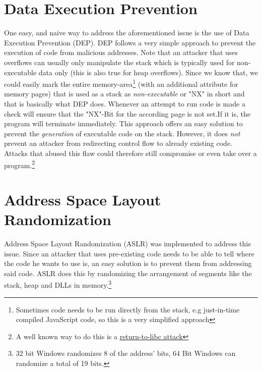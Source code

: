 \documentclass[10pt,twocolumn,a4paper]{article}
\begin{document}
\section{Data Execution Prevention}\label{sec:DEP}
One easy, and naive way to address the aforementioned issue is the use of Data Execution Prevention (DEP).
DEP follows a very simple approach to prevent the execution of code from malicious addresses.
Note that an attacker that uses overflows can usually only manipulate the stack which is typically used for non-executable data only (this is also true for heap overflows).
Since we know that, we could easily mark the entire memory-area\footnote{Sometimes code needs to be run directly from the stack, e.g just-in-time compiled JavaScript code, so this is a very simplified approach} (with an additional attribute for memory pages) that is used as a stack as \emph{non-executable} or "NX" in short and that is basically what DEP does.
Whenever an attempt to run code is made a check will ensure that the "NX"-Bit for the according page is not set.If it is, the program will terminate immediately.
This approach offers an easy solution to prevent the \emph{generation} of executable code on the stack. However, it does \emph{not} prevent an attacker from redirecting control flow to already existing code. Attacks that abused this flaw could therefore still compromise or even take over a program.\footnote{A well known way to do this is a \hyperref{https://en.wikipedia.org/wiki/Return-to-libc_attack}{Return-to-Libc Exploits}{name}{return-to-libc attack}}

\section{Address Space Layout Randomization}\label{sec:ASLR}
Address Space Layout Randomization (ASLR) was implemented to address this issue.
Since an attacker that uses pre-existing code needs to be able to tell where the code he wants to use is, an easy solution is to prevent them from addressing said code.
ASLR does this by randomizing the arrangement of segments like the stack, heap and DLLs in memory.\footnote{32 bit Windows randomizes 8 of the address' bits, 64 Bit Windows can randomize a total of 19 bits.}

\end{document}
